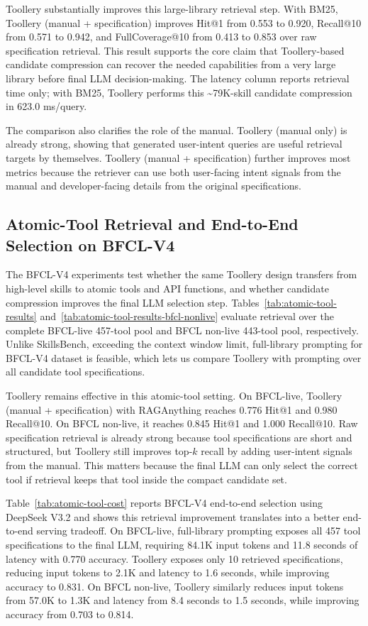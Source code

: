 \documentclass[11pt]{article}
\begin{document}
Toollery substantially improves this large-library retrieval step. With BM25, Toollery (manual + specification) improves Hit@1 from 0.553 to 0.920, Recall@10 from 0.571 to 0.942, and FullCoverage@10 from 0.413 to 0.853 over raw specification retrieval. This result supports the core claim that Toollery-based candidate compression can recover the needed capabilities from a very large library before final LLM decision-making. The latency column reports retrieval time only; with BM25, Toollery performs this \textasciitilde{}79K-skill candidate compression in 623.0 ms/query.

The comparison also clarifies the role of the manual. Toollery (manual only) is already strong, showing that generated user-intent queries are useful retrieval targets by themselves. Toollery (manual + specification) further improves most metrics because the retriever can use both user-facing intent signals from the manual and developer-facing details from the original specifications.

\subsection{Atomic-Tool Retrieval and End-to-End Selection on BFCL-V4}
\label{subsec:atomic-retrieval-results}

The BFCL-V4 experiments test whether the same Toollery design transfers from high-level skills to atomic tools and API functions, and whether candidate compression improves the final LLM selection step. Tables~\ref{tab:atomic-tool-results} and~\ref{tab:atomic-tool-results-bfcl-nonlive} evaluate retrieval over the complete BFCL-live 457-tool pool and BFCL non-live 443-tool pool, respectively. Unlike SkillsBench, exceeding the context window limit, full-library prompting for BFCL-V4 dataset is feasible, which lets us compare Toollery with prompting over all candidate tool specifications.

Toollery remains effective in this atomic-tool setting. On BFCL-live, Toollery (manual + specification) with RAGAnything reaches 0.776 Hit@1 and 0.980 Recall@10. On BFCL non-live, it reaches 0.845 Hit@1 and 1.000 Recall@10. Raw specification retrieval is already strong because tool specifications are short and structured, but Toollery still improves top-$k$ recall by adding user-intent signals from the manual. This matters because the final LLM can only select the correct tool if retrieval keeps that tool inside the compact candidate set.

Table~\ref{tab:atomic-tool-cost} reports BFCL-V4 end-to-end selection using DeepSeek V3.2 and shows this retrieval improvement translates into a better end-to-end serving tradeoff. On BFCL-live, full-library prompting exposes all 457 tool specifications to the final LLM, requiring 84.1K input tokens and 11.8 seconds of latency with 0.770 accuracy. Toollery exposes only 10 retrieved specifications, reducing input tokens to 2.1K and latency to 1.6 seconds, while improving accuracy to 0.831. On BFCL non-live, Toollery similarly reduces input tokens from 57.0K to 1.3K and latency from 8.4 seconds to 1.5 seconds, while improving accuracy from 0.703 to 0.814.
\end{document}
